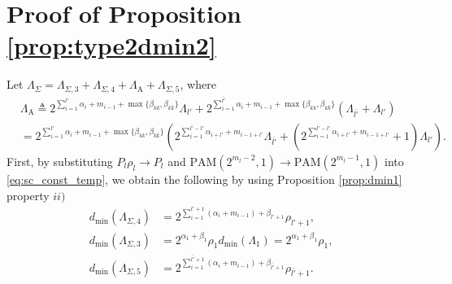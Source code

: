 \documentclass[12pt, draftclsnofoot, onecolumn]{IEEEtran}
\theoremstyle{definition}
\begin{document}




\section{Proof of Proposition \ref{prop:type2dmin2}}\label{appE}
Let $\Lambda_{\Sigma} = \Lambda_{\Sigma,3}+\Lambda_{\Sigma,4}+\Lambda_\text{A}+\Lambda_{\Sigma,5}$, where
\begin{align}
&\Lambda_\text{A}\triangleq 2^{\sum_{i=1}^{l'}\alpha_i+m_{i-1}+\max\{\beta_{kk},\beta_{k\bar{k}}\}}\Lambda_{l'}
+ 2^{\sum_{i=1}^{\bar{l'}}\alpha_i+m_{i-1}+\max\{\beta_{kk},\beta_{k\bar{k}}\}}(\Lambda_{\bar{l'}}+\Lambda_{l'}) \nonumber \\
&=2^{\sum_{i=1}^{l'}\alpha_i+m_{i-1}+\max\{\beta_{kk},\beta_{k\bar{k}}\}}\left(2^{\sum_{i=1}^{\bar{l'}-l'}\alpha_{i+l'}+m_{i-1+l'}}\Lambda_{\bar{l'}}+  \left(2^{\sum_{i=1}^{\bar{l'}-l'}\alpha_{i+l'}+m_{i-1+l'}}+1 \right)\Lambda_{l'}\right). \label{eq:lambda_A}
\end{align}
First, by substituting $P_l\rho_l \rightarrow P_l$ and $\text{PAM}(2^{m_l-2},1) \rightarrow \text{PAM}(2^{m_l-1},1)$ into \eqref{eq:sc_const_temp}, we obtain the following by using Proposition \ref{prop:dmin1} property $ii)$
\begin{align}
d_{\min}(\Lambda_{\Sigma,4}) &= 2^{\sum_{i=1}^{l'+1}(\alpha_i+m_{i-1})+\beta_{l'+1}}\rho_{l'+1}, \label{eq:lambda_sigma2}\\
d_{\min}(\Lambda_{\Sigma,3}) &= 2^{\alpha_1+\beta_1}\rho_1d_{\min}(\Lambda_1) = 2^{\alpha_1+\beta_1}\rho_1, \label{eq:lambda_sigma3a}\\
d_{\min}(\Lambda_{\Sigma,5})& = 2^{\sum_{i=1}^{\bar{l'}+1}(\alpha_i+m_{i-1})+\beta_{\bar{l'}+1}}\rho_{\bar{l'}+1}.\label{eq:lambda_sigma5_dmin}
\end{align}
\end{document}
